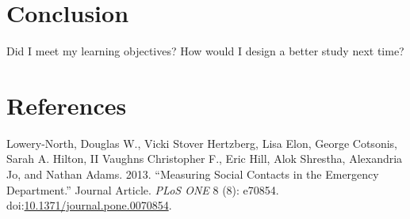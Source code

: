 \documentclass[]{elsarticle} %
\begin{document}
\section{Conclusion}\label{conclusion}

Did I meet my learning objectives? How would I design a better study
next time?

\section*{References}\label{references.unnumbered}

\hypertarget{refs}{}
\hypertarget{ref-RN1X}{}
Lowery-North, Douglas W., Vicki Stover Hertzberg, Lisa Elon, George
Cotsonis, Sarah A. Hilton, II Vaughns Christopher F., Eric Hill, Alok
Shrestha, Alexandria Jo, and Nathan Adams. 2013. ``Measuring Social
Contacts in the Emergency Department.'' Journal Article. \emph{PLoS ONE}
8 (8): e70854.
doi:\href{https://doi.org/10.1371/journal.pone.0070854}{10.1371/journal.pone.0070854}.
\end{document}

